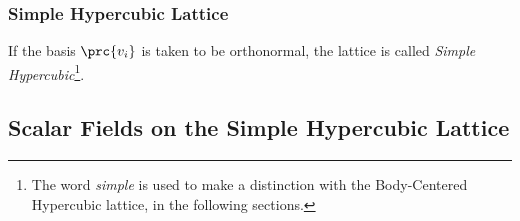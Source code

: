 \subsubsection{Simple Hypercubic Lattice}
If the basis $\prc{v_i}$ is taken to be orthonormal, the lattice is called \emph{Simple Hypercubic}\footnote{The word \emph{simple} is used to make a distinction with the Body-Centered Hypercubic lattice, in the following sections.}.

\subsection{Scalar Fields on the Simple Hypercubic Lattice}
